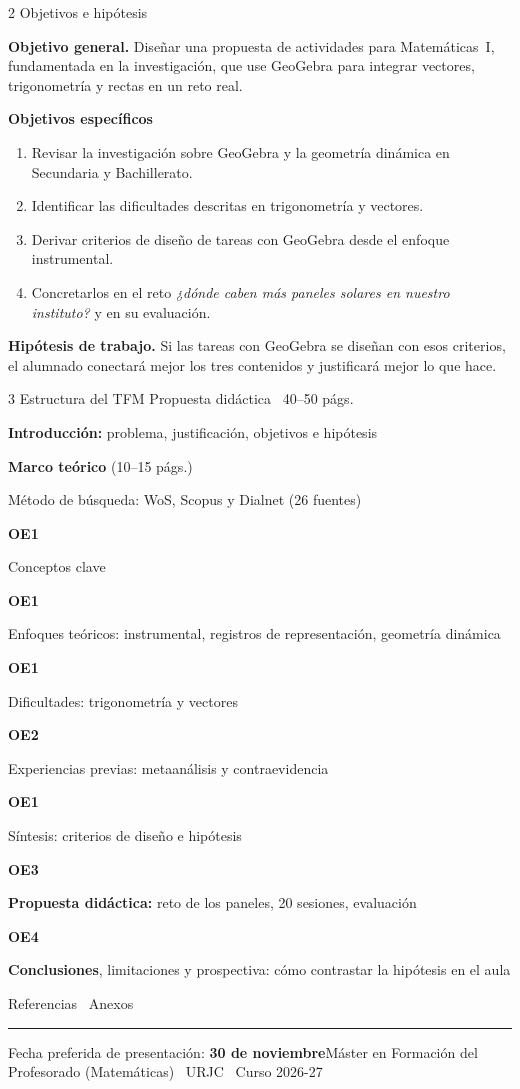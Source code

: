 \documentclass[11pt]{article}
\newcommand{\idx}[3]{\par\noindent\makebox[2.1em][l]{\color{urjc}\bfseries #1}%
  \parbox[t]{\dimexpr\linewidth-2.1em-3.2em\relax}{\raggedright #2}\hfill{\small\bfseries\color{urjc}#3}\par\vspace{2.5pt}}
\begin{document}
\begin{minipage}[t]{0.315\linewidth}
\begin{bloque}[height=11.3cm]{2 \textperiodcentered{} Objetivos e hipótesis}
\begin{destacado}
\textbf{\color{urjc}Objetivo general.} Diseñar una propuesta de actividades para Matemáticas~I, fundamentada en la investigación, que use GeoGebra para integrar vectores, trigonometría y rectas en un reto real.
\end{destacado}
\vspace{2pt}
\textbf{Objetivos específicos}
\begin{enumerate}[label={\color{urjc}\bfseries OE\arabic*}, leftmargin=2.5em]
  \item Revisar la investigación sobre GeoGebra y la geometría dinámica en Secundaria y Bachillerato.
  \item Identificar las dificultades descritas en trigonometría y vectores.
  \item Derivar criterios de diseño de tareas con GeoGebra desde el enfoque instrumental.
  \item Concretarlos en el reto \emph{¿dónde caben más paneles solares en nuestro instituto?} y en su evaluación.
\end{enumerate}
\vspace{4pt}
\begin{destacado}
\textbf{\color{urjc}Hipótesis de trabajo.} Si las tareas con GeoGebra se diseñan con esos criterios, el alumnado conectará mejor los tres contenidos y justificará mejor lo que hace.
\end{destacado}
\end{bloque}
\end{minipage}\hfill
\begin{minipage}[t]{0.345\linewidth}
\begin{bloque}[height=11.3cm]{3 \textperiodcentered{} Estructura del TFM}
{\color{pistagris}Propuesta didáctica \textbullet\ 40--50 págs.}\par\vspace{4pt}
\idx{1.}{\textbf{Introducción:} problema, justificación, objetivos e hipótesis}{}
\begin{tcolorbox}[enhanced, colback=rosa, colframe=urjc, boxrule=0pt, leftrule=2.5pt, arc=0pt,
  left=4pt, right=4pt, top=4pt, bottom=1pt]
\idx{2.}{\textbf{Marco teórico} (10--15 págs.)}{}
\idx{2.1}{Método de búsqueda: WoS, Scopus y Dialnet (26 fuentes)}{OE1}
\idx{2.2}{Conceptos clave}{OE1}
\idx{2.3}{Enfoques teóricos: instrumental, registros de representación, geometría dinámica}{OE1}
\idx{2.4}{Dificultades: trigonometría y vectores}{OE2}
\idx{2.5}{Experiencias previas: metaanálisis y contraevidencia}{OE1}
\idx{2.6}{Síntesis: criterios de diseño e hipótesis}{OE3}
\end{tcolorbox}
\vspace{3pt}
\idx{3.}{\textbf{Propuesta didáctica:} reto de los paneles, 20 sesiones, evaluación}{OE4}
\idx{4.}{\textbf{Conclusiones}, limitaciones y prospectiva: cómo contrastar la hipótesis en el aula}{}
{\color{pistagris}Referencias \textbullet\ Anexos}
\end{bloque}
\end{minipage}

\vfill
{\color{urjc}\rule{\linewidth}{0.6pt}}\par
\vspace{2pt}
{\small\color{pistagris}Fecha preferida de presentación: \textbf{30 de noviembre}\hfill Máster en Formación del Profesorado (Matemáticas) \textbullet\ URJC \textbullet\ Curso 2026-27}
\end{document}

